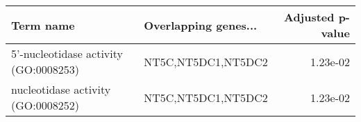 \begin{tabular}{llr}
\toprule
                            Term name & Overlapping genes... &  Adjusted p-value \\
\midrule
5'-nucleotidase activity (GO:0008253) &   NT5C,NT5DC1,NT5DC2 &          1.23e-02 \\
   nucleotidase activity (GO:0008252) &   NT5C,NT5DC1,NT5DC2 &          1.23e-02 \\
\bottomrule
\end{tabular}
